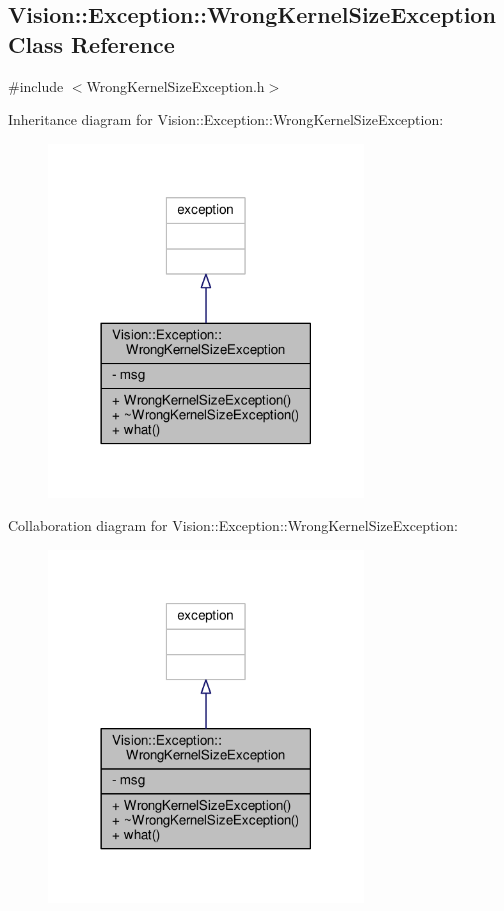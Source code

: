 \hypertarget{class_vision_1_1_exception_1_1_wrong_kernel_size_exception}{}\subsection{Vision\+:\+:Exception\+:\+:Wrong\+Kernel\+Size\+Exception Class Reference}
\label{class_vision_1_1_exception_1_1_wrong_kernel_size_exception}


{\ttfamily \#include $<$Wrong\+Kernel\+Size\+Exception.\+h$>$}



Inheritance diagram for Vision\+:\+:Exception\+:\+:Wrong\+Kernel\+Size\+Exception\+:
\nopagebreak
\begin{figure}[H]
\begin{center}
\leavevmode
\includegraphics[width=237pt]{class_vision_1_1_exception_1_1_wrong_kernel_size_exception__inherit__graph}
\end{center}
\end{figure}


Collaboration diagram for Vision\+:\+:Exception\+:\+:Wrong\+Kernel\+Size\+Exception\+:
\nopagebreak
\begin{figure}[H]
\begin{center}
\leavevmode
\includegraphics[width=237pt]{class_vision_1_1_exception_1_1_wrong_kernel_size_exception__coll__graph}
\end{center}
\end{figure}
